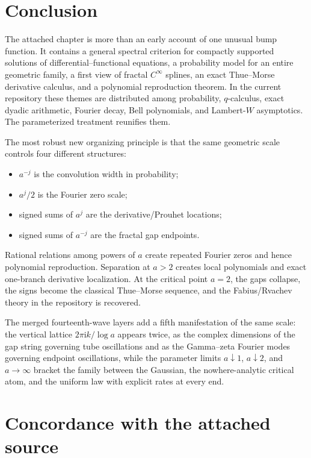 \documentclass[11pt,oneside]{article}
\numberwithin{equation}{section}
\theoremstyle{definition}
\theoremstyle{remark}
\newcommand{\ii}{\mathrm i}
\begin{document}
\section{Conclusion}

The attached chapter is more than an early account of one unusual bump
function.  It contains a general spectral criterion for compactly supported
solutions of differential--functional equations, a probability model for an
entire geometric family, a first view of fractal $C^\infty$ splines, an exact
Thue--Morse derivative calculus, and a polynomial reproduction theorem.  In the
current repository these themes are distributed among probability,
$q$-calculus, exact dyadic arithmetic, Fourier decay, Bell polynomials, and
Lambert-$W$ asymptotics.  The parameterized treatment reunifies them.

The most robust new organizing principle is that the same geometric scale
controls four different structures:
\begin{itemize}
\item $a^{-j}$ is the convolution width in probability;
\item $a^j/2$ is the Fourier zero scale;
\item signed sums of $a^j$ are the derivative/Prouhet locations;
\item signed sums of $a^{-j}$ are the fractal gap endpoints.
\end{itemize}
Rational relations among powers of $a$ create repeated Fourier zeros and hence
polynomial reproduction.  Separation at $a>2$ creates local polynomials and
exact one-branch derivative localization.  At the critical point $a=2$, the
gaps collapse, the signs become the classical Thue--Morse sequence, and the
Fabius/Rvachev theory in the repository is recovered.

The merged fourteenth-wave layers add a fifth manifestation of the same scale:
the vertical lattice $2\pi\ii k/\log a$ appears twice, as the complex
dimensions of the gap string governing tube oscillations and as the
Gamma--zeta Fourier modes governing endpoint oscillations, while the parameter
limits $a\downarrow1$, $a\downarrow2$, and $a\to\infty$ bracket the family
between the Gaussian, the nowhere-analytic critical atom, and the uniform law
with explicit rates at every end.

\appendix
\section{Concordance with the attached source}
\end{document}
